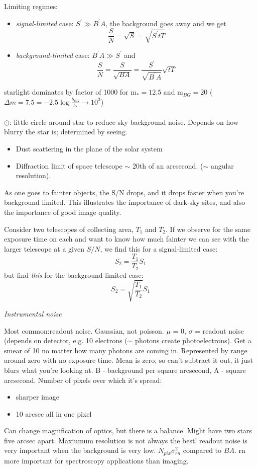 \documentclass[12pt]{article}
\begin{document}
Limiting regimes:
\begin{itemize}
    \item \emph{signal-limited} case: $S^{\prime}\gg B^{\prime}A$,
        the background goes away and we get
         $$ \frac{S}{N} = \sqrt{S} = \sqrt{S^{\prime}tT} $$
    \item \emph{background-limited} case: $B^{\prime}A\gg S^{\prime}$
        and
        $$ \frac{S}{N} = \frac{S}{\sqrt{BA}} =
        \frac{S^{\prime}}{\sqrt{B^{\prime}A}}\sqrt{tT} $$
\end{itemize}

\textcolor{myBlue}{starlight dominates by factor of 1000 for
m$_* = 12.5$ and m$_{BG} = 20$ ($\Delta m = 7.5
= -2.5\log\frac{b_{BG}}{b_*}
\rightarrow 10^3$)\\\\
\large$\odot$: \normalsize little circle around star to reduce sky
background noise. Depends on how blurry the star is; determined by
seeing.
\begin{itemize}
    \item Dust scattering in the plane of the solar system
    \item Diffraction limit of space telescope $\sim$ 20th of an
    arcsecond. ($\sim$ angular resolution).
\end{itemize}
}

As one goes to fainter objects, the S/N drops, and it drops faster
when you're background limited. This illustrates the importance of
dark-sky sites, and also the importance of good image quality.

Consider two telescopes of collecting area, $T_1$ and $T_2$.
If we observe for the same exposure time on each and want to know how
much fainter we can see with the larger telescope at a given $S/N$, we
find this for a signal-limited case:
$$ S_2 = \frac{T_1}{T_2}S_1 $$
but find \emph{this} for the background-limited case:
$$ S_2 = \sqrt{\frac{T_1}{T_2}}S_1  $$


\textcolor{om}{\emph{}}

\emph{Instrumental noise}

\textcolor{myBlue}{Most common:readout noise. Gaussian, not poisson.
$\mu$ = 0, $\sigma$ = readout noise (depends on detector, e.g. 10
electrons ($\sim$ photons create photoelectrons). Get a smear of 10 no
matter how many photons are coming in. Represented by range around
zero with no exposure time. Mean is zero, so can't subtract it out, it
just blurs what you're looking at. B - background per square
arcsecond, A - square arcsecond. Number of pixels over which it's
spread:
\begin{itemize}
    \item sharper image
    \item 10 arcsec all in one pixel
\end{itemize}
Can change magnification of optics, but there is a balance. Might have
two stars five arcsec apart. Maxiumum resolution is not always the
best! readout noise is very important when the background is very low.
$N_{pix}\sigma_{rn}^2$ compared to $BA$. rn more important for
spectroscopy applications than imaging.
}
\end{document}
